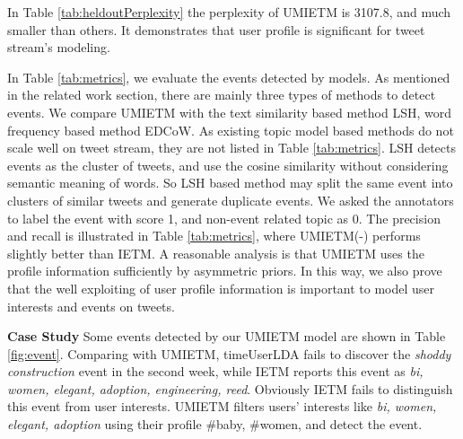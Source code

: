 \documentclass[runningheads,a4paper]{llncs}
\begin{document}
In Table \ref{tab:heldoutPerplexity} the perplexity of UMIETM is 3107.8, and much smaller than others. It demonstrates that user profile is significant for tweet stream's modeling.

In Table \ref{tab:metrics}, we evaluate the events detected by models.
As mentioned in the related work section, there are mainly three types of methods to detect events. 
We compare UMIETM with the text similarity based method LSH\cite{petrovic2010streaming}, word frequency based method EDCoW\cite{weng2011eventWavelet}. 
As existing topic model based methods\cite{timeUserLDA2012finding}\cite{diao2013unified}\cite{Yan:2015wm} do not scale well on tweet stream, they are not listed in Table \ref{tab:metrics}.
LSH\cite{petrovic2010streaming} detects events as the cluster of tweets, and use the cosine similarity without considering semantic meaning of words. 
So LSH based method may split the same event into clusters of similar tweets and generate duplicate events.
We asked the annotators to label the event with score 1, and non-event related topic as 0. 
The precision and recall is illustrated in Table \ref{tab:metrics}, where UMIETM(-) performs slightly better than IETM. 
A reasonable analysis is that UMIETM uses the profile information sufficiently by asymmetric priors\cite{wallach2009rethinking}. 
In this way, we also prove that the well exploiting of user profile information is important to model user interests and events on tweets. 

\textbf{Case Study} 
Some events detected by our UMIETM model are shown in Table \ref{fig:event}.
Comparing with UMIETM, timeUserLDA fails to discover the \textit{shoddy construction} event in the second week, while IETM reports this event as \textit{bi, women, elegant, adoption, engineering, reed}. Obviously IETM fails to distinguish this event from user interests.
UMIETM filters users' interests like \textit{bi, women, elegant, adoption} using their profile {\#baby, \#women}, and detect the event.
\end{document}
